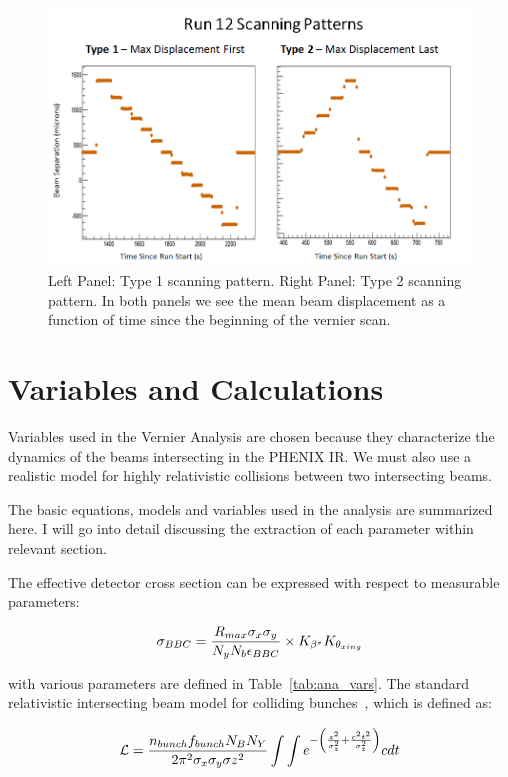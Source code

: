 \begin{figure}[ht] 
  \centering
  \includegraphics[width=0.75\linewidth]{./figures/scan_patterns} 
  \caption{ 
    Left Panel: Type 1 scanning pattern. Right Panel: Type 2 scanning pattern.
    In both panels we see the mean beam displacement as a function of time
    since the beginning of the vernier scan.
  }
  \label{fig:scan_patterns}
\end{figure}

\section{Variables and Calculations}
\label{sec:VariablesAndCalculations}

Variables used in the Vernier Analysis are chosen because they characterize the
dynamics of the beams intersecting in the PHENIX IR. We must also use a
realistic model for highly relativistic collisions between two intersecting
beams.

The basic equations, models and variables used in the analysis are summarized
here. I will go into detail discussing the extraction of each parameter within
relevant section.

The effective detector cross section can be expressed with respect to
measurable parameters:

\begin{equation}
  \sigma_{BBC} = {{R_{max}\sigma_x\sigma_y}\over{N_y N_b
\epsilon_{BBC}}}\times{K_{\beta^*}K_{\theta_{xing}}}
\end{equation}

{\noindent}with various parameters are defined in Table~\ref{tab:ana_vars}.
The standard relativistic intersecting beam model for colliding
bunches~\cite{AN888Datta2010}, which is defined as:

\begin{equation}
\label{eq:reletivistic_beam_final} 
\mathcal{L} = {{n_{bunch} f_{bunch} N_{B} N_{Y} }\over{ 2 \pi^{2} \sigma_{x}
\sigma_{y}\sigma{z}^2}} \int \int
e^{-\left({{z^{2}}\over{\sigma_{z}^{2}}}+{{c^{2}t^{2}}\over{\sigma_{z}^{2}}}\right)} c dt
\end{equation}


